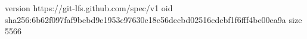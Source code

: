 version https://git-lfs.github.com/spec/v1
oid sha256:6b62f097faf9bebd9e1953c97630c18e56decbd02516cdcbf1f6fff4be00ea9a
size 5566
